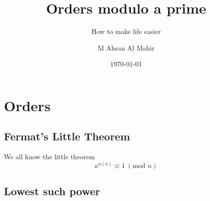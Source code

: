 \documentclass[compress]{beamer}
\title{Orders modulo a prime}
\subtitle{How to make life easier}
\author{M Ahsan Al Mahir}
\date{\today}
\begin{document}
\begin{frame}
    \maketitle
\end{frame}

\section{Orders}
\subsection{Fermat's Little Theorem}

\begin{frame}
    We all know the little theorem
    \[a^{\phi(n)} \equiv 1\ \left(\text{mod } n\right) \] 
\end{frame}

\subsection{Lowest such power}
\end{document}

